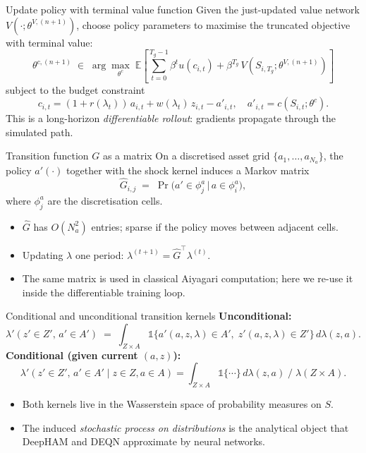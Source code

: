 \begin{frame}{Update policy with terminal value function}
Given the just-updated value network $V(\cdot;\theta^{V,(n+1)})$, choose policy parameters to maximise the truncated objective with terminal value:
\[
\theta^{c,(n+1)} \;\in\; \arg\max_{\theta^c}\;
\mathbb{E}\!\left[\sum_{t=0}^{T_g-1}\beta^t u(c_{i,t}) + \beta^{T_g}\, V(S_{i,T_g};\theta^{V,(n+1)})\right]
\]
subject to the budget constraint
\[
c_{i,t} = (1+r(\lambda_t))\,a_{i,t} + w(\lambda_t)\,z_{i,t} - a'_{i,t},
\quad a'_{i,t} = c(S_{i,t};\theta^c).
\]
\medskip
This is a long-horizon \emph{differentiable rollout}: gradients propagate through the simulated path.
\end{frame}

\begin{frame}{Transition function $G$ as a matrix}
On a discretised asset grid $\{a_1,\ldots,a_{N_a}\}$, the policy $a'(\cdot)$ together with the shock kernel induces a Markov matrix
\[
\hat G_{i,j} \;=\; \Pr\!\big(a' \in \phi_j^a \,\big|\, a \in \phi_i^a\big),
\]
where $\phi_j^a$ are the discretisation cells.
\medskip
\begin{itemize}
\item $\hat G$ has $O(N_a^2)$ entries; sparse if the policy moves between adjacent cells.
\item Updating $\lambda$ one period: $\lambda^{(t+1)} = \hat G^\top \lambda^{(t)}$.
\item The same matrix is used in classical Aiyagari computation; here we re-use it inside the differentiable training loop.
\end{itemize}
\end{frame}

\begin{frame}{Conditional and unconditional transition kernels}
\textbf{Unconditional:}
\[
\lambda'(z' \in Z',\, a' \in A')
\;=\;
\int_{Z\times A} \mathbb{1}\!\big\{a'(a,z,\lambda)\in A',\; z'(a,z,\lambda)\in Z'\big\}\, d\lambda(z,a).
\]
\medskip
\textbf{Conditional (given current $(a,z)$):}
\[
\lambda'(z' \in Z',\, a' \in A' \mid z\in Z, a\in A)
=
\int_{Z\times A}\!\!\mathbb{1}\!\{\cdots\}\, d\lambda(z,a) \;/\; \lambda(Z\times A).
\]
\medskip
\begin{itemize}
\item Both kernels live in the Wasserstein space of probability measures on $S$.
\item The induced \emph{stochastic process on distributions} is the analytical object that DeepHAM and DEQN approximate by neural networks.
\end{itemize}
\end{frame}

